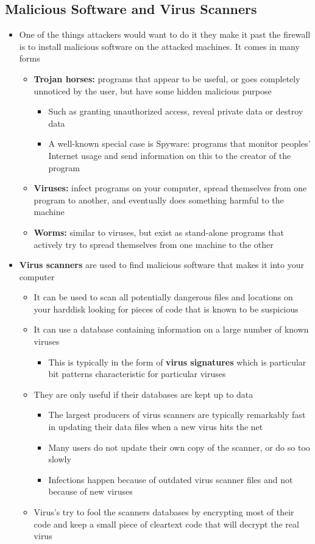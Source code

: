 \documentclass[11pt]{article}
\begin{document}
\subsection{Malicious Software and Virus Scanners}
\label{sec:org04daec8}
\begin{itemize}
\item One of the things attackers would want to do it they make it past the firewall is to install malicious software on the attacked machines. It comes in many forms
\begin{itemize}
\item \textbf{Trojan horses:} programs that appear to be useful, or goes completely unnoticed by the user,   but have some hidden malicious purpose
\begin{itemize}
\item Such as granting unauthorized access, reveal private data or destroy data
\item A well-known special case is Spyware: programs that monitor peoples’ Internet usage and send information on this to the creator of the program
\end{itemize}
\item \textbf{Viruses:} infect programs on your computer, spread themselves from one program to another, and eventually does something harmful to the machine
\item \textbf{Worms:} similar to viruses, but exist as stand-alone programs that actively try to spread themselves from one machine to the other
\end{itemize}

\item \textbf{Virus scanners} are used to find malicious software that makes it into your computer
\begin{itemize}
\item It can be used to scan all potentially dangerous files and locations on your harddisk looking for pieces of code that is known to be suspicious
\item It can use a database containing information on a large number of known viruses
\begin{itemize}
\item This is typically in the form of \textbf{virus signatures} which is particular bit patterns characteristic for particular viruses
\end{itemize}
\item They are only useful if their databases are kept up to data
\begin{itemize}
\item The largest producers of virus scanners are typically remarkably fast in updating their data files when a new virus hits the net
\item Many users do not update their own copy of the scanner, or do so too slowly
\item Infections happen because of outdated virus scanner files and not because of new viruses
\end{itemize}
\item Virus's try to fool the scanners databases by encrypting most of their code and keep a small piece of cleartext code that will decrypt the real virus
\end{itemize}


\end{itemize}
\end{document}
